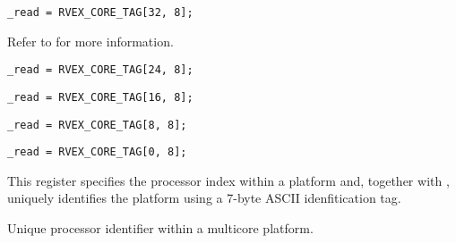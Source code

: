 \implementation{}
\begin{lstlisting}
_read = RVEX_CORE_TAG[32, 8];
\end{lstlisting}


Refer to  for more information.

\implementation{}
\begin{lstlisting}
_read = RVEX_CORE_TAG[24, 8];
\end{lstlisting}

\implementation{}
\begin{lstlisting}
_read = RVEX_CORE_TAG[16, 8];
\end{lstlisting}

\implementation{}
\begin{lstlisting}
_read = RVEX_CORE_TAG[8, 8];
\end{lstlisting}

\implementation{}
\begin{lstlisting}
_read = RVEX_CORE_TAG[0, 8];
\end{lstlisting}


This register specifies the processor index within a platform and, together with
, uniquely identifies the platform using a 7-byte ASCII
idenfitication tag.

Unique processor identifier within a multicore platform.

